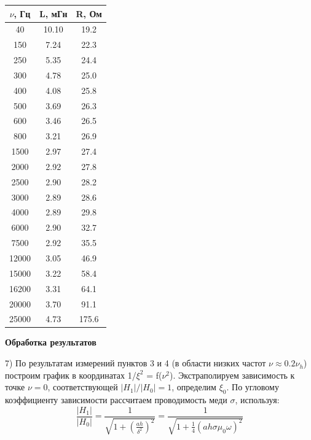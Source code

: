 \documentclass[a4paper,12pt]{article}
\begin{document}
\begin{center}
\begin{tabular}{|c|c|c|}
	\hline
	$\nu$, Гц & L, мГн & R, Ом\\
	\hline
	40 & 10.10 & 19.2 \\
	\hline
	150 & 7.24 & 22.3 \\
	\hline
	250 & 5.35 & 24.4 \\
	\hline
	300 & 4.78 & 25.0 \\
	\hline
	400 & 4.08 & 25.8 \\
	\hline
	500 & 3.69 & 26.3 \\
	\hline
	600 & 3.46 & 26.5 \\
	\hline
	800 & 3.21 & 26.9 \\
	\hline
	1500 & 2.97 & 27.4 \\
	\hline
	2000 & 2.92 & 27.8 \\
	\hline
	2500 & 2.90 & 28.2 \\
	\hline
	3000 & 2.89 & 28.6 \\
	\hline
	4000 & 2.89 & 29.8 \\
	\hline
	6000 & 2.90 & 32.7 \\
	\hline
	7500 & 2.92 & 35.5 \\
	\hline
	12000 & 3.05 & 46.9\\
	\hline
	15000 & 3.22 & 58.4 \\
	\hline
	16200 & 3.31 & 64.1 \\
	\hline
	20000 & 3.70 & 91.1 \\
	\hline
	25000 & 4.73 & 175.6 \\
	\hline
\end{tabular}
\end{center}

\par\textbf{Обработка результатов}

\par7) По результатам измерений пунктов 3 и 4 (в области низких частот $\nu \approx 0.2\nu_h$) построим график в координатах 1/$\xi^2$ = f($\nu^2$). Экстраполируем зависимость к точке $\nu = 0$, соответствующей $|H_1|/|H_0| = 1$, определим $\xi_0$. По угловому коэффициенту зависимости рассчитаем проводимость меди $\sigma$, используя:\\

$$ \frac{|H_1|}{|H_0|} = \frac{1}{\sqrt{1+{(\frac{ah}{\delta^2})}^2}} = \frac{1}{\sqrt{1+\frac{1}{4}{(ah\sigma \mu_0 \omega)}^2}}$$

\end{document}
